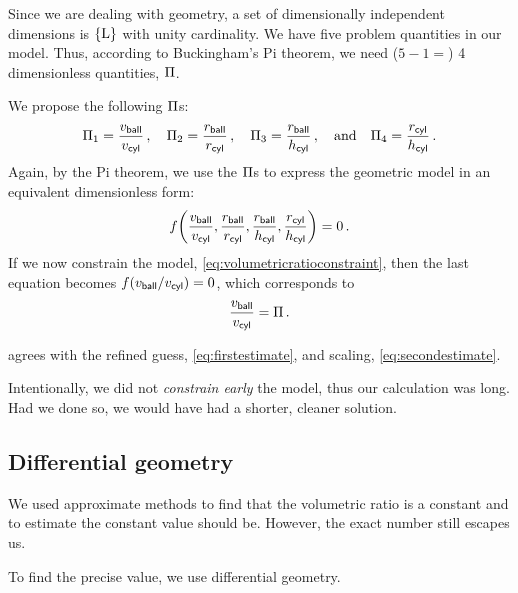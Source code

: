  Since we are dealing with geometry, a set of dimensionally independent dimensions is $\elset{\phdim L}$ with unity cardinality. We have five problem quantities in our model. Thus, according to Buckingham's Pi theorem, we need ($5 - 1 =$) 4 dimensionless quantities, $\Pi$.

 We propose the following $\Pi$s:
%
\begin{equation*}
  \Pi_1 = \dfrac{v_{\text{\textsf{ball}}}}{v_{\text{\textsf{cyl}}}}\,,\quad
  \Pi_2 = \dfrac{r_{\text{\textsf{ball}}}}{r_{\text{\textsf{cyl}}}}\,,\quad
  \Pi_3 = \dfrac{r_{\text{\textsf{ball}}}}{h_{\text{\textsf{cyl}}}}\,,\quad\text{and}\quad
  \Pi_4 = \dfrac{r_{\text{\textsf{cyl}}}}{h_{\text{\textsf{cyl}}}}\,.
\end{equation*}
%
 Again, by the Pi theorem, we use the $\Pi$s to express the geometric model in an equivalent dimensionless form:
%
\begin{equation*}
  f\vat{\dfrac{\vball}{\vcyl}, \dfrac{\rball}{\rcyl}, \dfrac{\rball}{\hcyl}, \dfrac{\rcyl}{\hcyl}} = 0\,.
\end{equation*}
%
 If we now constrain the model, \cref{eq:volumetricratioconstraint}, then the last equation becomes $f\vat{\vball/\vcyl} = 0$, which corresponds to
%
\begin{equation}\label{eq:thirdestimate}
  \dfrac{v_{\text{\textsf{ball}}}}{v_{\text{\textsf{cyl}}}} = \Pi\,.
\end{equation}

  agrees with the refined guess, \cref{eq:firstestimate}, and scaling, \cref{eq:secondestimate}.

 Intentionally, we did not \emph{constrain early} the model, thus our calculation was long. Had we done so, we would have had a shorter, cleaner solution.



\subsection{Differential geometry} %
\label{sub:differential_geometry}
%
 We used approximate methods to find that the volumetric ratio is a constant and to estimate the constant value should be. However, the exact number still escapes us.

 To find the precise value, we use differential geometry.

